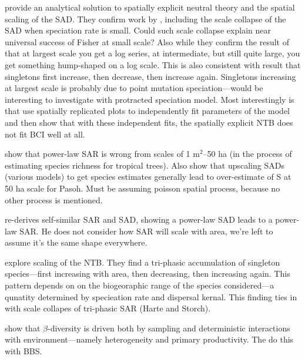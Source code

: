\documentclass[12pt]{article}
\begin{document}
\citet{odwyer2017} provide an analytical solution to spatially
explicit neutral theory and the spatial scaling of the SAD. They
confirm work by \citet{rosindell2013}, including the scale collapse of
the SAD when speciation rate is small.  Could such scale collapse
explain near universal success of Fisher at small scale?  Also while
they confirm the result of \citet{rosindell2013} that at largest scale
you get a log series, at intermediate, but still quite large, you get
something hump-shaped on a log scale.  This is also consistent with
\citet{rosindell2013} result that singletons first increase, then
decrease, then increase again.  Singletons increasing at largest scale
is probably due to point mutation speciation---would be interesting to
investigate with protracted speciation model.  Most interestingly is
that \citet{odwyer2017} use spatially replicated plots to
independently fit parameters of the model and then show that with
these independent fits, the spatially explicit NTB does not fit BCI
well at all.

\citet{plotkin2000} show that power-law SAR is wrong from scales of 1
m$^2$--50 ha (in the process of estimating species richness for
tropical trees).  Also show that upscaling SADs (various models) to
get species estimates generally lead to over-estimate of S at 50 ha
scale for Pasoh.  Must be assuming poisson spatial process, because no
other process is mentioned.

\citet{pueyo2006} re-derives self-similar SAR and SAD, showing a
power-law SAD leads to a power-law SAR.  He does not consider how SAR
will scale with area, we're left to assume it's the same shape
everywhere.

\citet{rosindell2013} explore scaling of the NTB.  They find a
tri-phasic accumulation of singleton species---first increasing with
area, then decreasing, then increasing again.  This pattern depends on
on the biogeoraphic range of the species considered---a qunatity
determined by specieation rate and dispersal kernal.  This finding
ties in with scale collapes of tri-phasic SAR (Harte and Storch).

\citet{stegen2013} show that $\beta$-diversity is driven both by
sampling and deterministic interactions with environment---namely
heterogeneity and primary productivity.  The do this with BBS.




\end{document}
